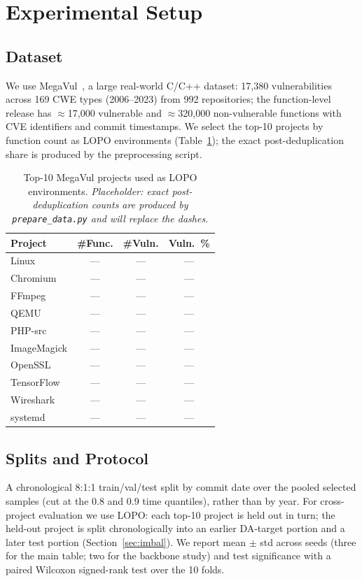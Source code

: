 \documentclass[conference]{IEEEtran}
\begin{document}
\section{Experimental Setup}
\label{sec:setup}
\subsection{Dataset}
We use MegaVul~\cite{megavul}, a large real-world C/C++ dataset:
17,380 vulnerabilities across 169 CWE types (2006--2023) from 992
repositories; the function-level release has $\approx$17,000
vulnerable and $\approx$320,000 non-vulnerable functions with CVE
identifiers and commit timestamps. We select the top-10 projects
by function count as LOPO environments (Table~\ref{tab:projects});
the exact post-deduplication share is produced by the
preprocessing script.

\begin{table}[t]
\centering
\caption{Top-10 MegaVul projects used as LOPO environments.
\emph{Placeholder: exact post-deduplication counts are produced by
\texttt{prepare\_data.py} and will replace the dashes.}}
\label{tab:projects}
\begin{tabular}{lccc}
\toprule
Project & \#Func. & \#Vuln. & Vuln.\ \% \\
\midrule
Linux & --- & --- & --- \\
Chromium & --- & --- & --- \\
FFmpeg & --- & --- & --- \\
QEMU & --- & --- & --- \\
PHP-src & --- & --- & --- \\
ImageMagick & --- & --- & --- \\
OpenSSL & --- & --- & --- \\
TensorFlow & --- & --- & --- \\
Wireshark & --- & --- & --- \\
systemd & --- & --- & --- \\
\bottomrule
\end{tabular}
\end{table}

\subsection{Splits and Protocol}
A chronological 8:1:1 train/val/test split by commit date over the
pooled selected samples (cut at the 0.8 and 0.9 time quantiles),
rather than by year. For cross-project evaluation we use LOPO: each
top-10 project is held out in turn; the held-out project is split
chronologically into an earlier DA-target portion and a later test
portion (Section~\ref{sec:imbal}). We report mean $\pm$ std across
seeds (three for the main table; two for the backbone study) and
test significance with a paired Wilcoxon signed-rank test over the
10 folds.
\end{document}
